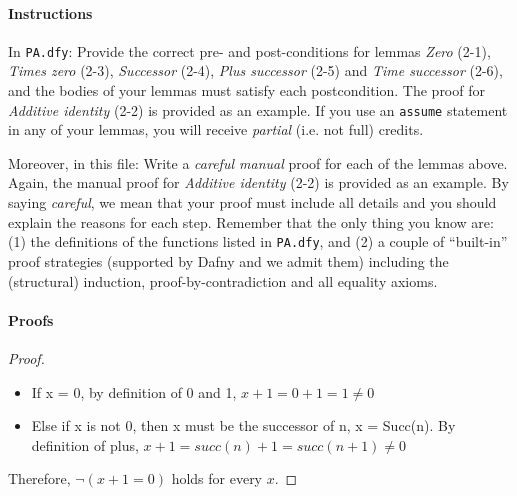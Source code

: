 \documentclass[11pt,a4paper]{article}
\begin{document}
\paragraph*{Instructions}

In \texttt{PA.dfy}:
Provide the correct pre- and post-conditions for lemmas \emph{Zero} (2-1), \emph{Times zero} (2-3), \emph{Successor} (2-4), \emph{Plus successor} (2-5) and \emph{Time successor} (2-6),
and the bodies of your lemmas must satisfy each postcondition.
The proof for \emph{Additive identity} (2-2) is provided as an example.
If you use an \texttt{assume} statement in any of your lemmas, you will receive \emph{partial} (i.e. not full) credits.

Moreover, in this file:
Write a \emph{careful manual} proof for each of the lemmas above.
Again, the manual proof for \emph{Additive identity} (2-2) is  provided as an example.
By saying \emph{careful}, we mean that your proof must include all details and you should explain the reasons for each step.
Remember that the only thing you know are:
(1) the definitions of the functions listed in \texttt{PA.dfy}, and 
(2) a couple of ``built-in'' proof strategies (supported by Dafny and we admit them) including the (structural) induction, proof-by-contradiction and all equality axioms.

\paragraph{Proofs}


\begin{proof}
    \begin{itemize}
    \item If x = 0, by definition of 0 and 1, $x + 1 = 0 + 1 = 1 \neq 0$\\
    \item Else if x is not 0, then x must be the successor of n, x = Succ(n).
          By definition of plus, $x + 1 = succ(n) + 1 = succ(n + 1) \neq 0$ 
	\end{itemize}
	  Therefore, $\lnot (x + 1 = 0)$ holds for every $x$.

\end{proof}

\end{document}
